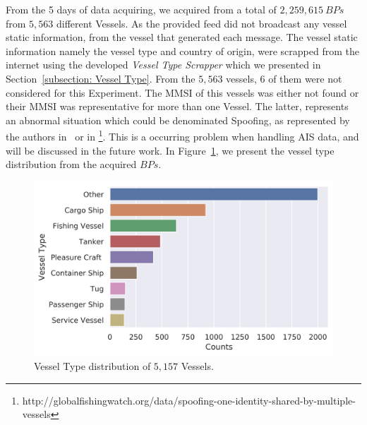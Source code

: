 From the 5 days of data acquiring, we acquired from a total of $2,259,615~BPs$ from $5,563$ different Vessels.
As the provided feed did not broadcast any vessel static information, from the vessel that generated each message. The vessel static information namely the vessel type and country of origin, were scrapped from the internet using the developed \emph{Vessel Type Scrapper} which we presented in Section~\ref{subsection: Vessel Type}. 
From the $5,563$ vessels, $6$ of them were not considered for this Experiment. The MMSI of this vessels was either not found or their MMSI was representative for more than one Vessel. The latter, represents an abnormal situation which could be denominated Spoofing, as represented by the authors in~\cite{Ray2015DeAISRisks} or in \footnote{http://globalfishingwatch.org/data/spoofing-one-identity-shared-by-multiple-vessels}. This is a occurring problem when handling AIS data, and will be discussed in the future work.
In Figure~\ref{fig: 5 Vessel Type Distribution}, we present the vessel type distribution from the acquired $BPs$.
\begin{figure}[H]
	\centering
	\includegraphics[scale = .7]{figures/Ch5/DataValidationVesselType.png}
    \caption{Vessel Type distribution of $5,157$ Vessels.}
    \label{fig: 5 Vessel Type Distribution}
\end{figure}


